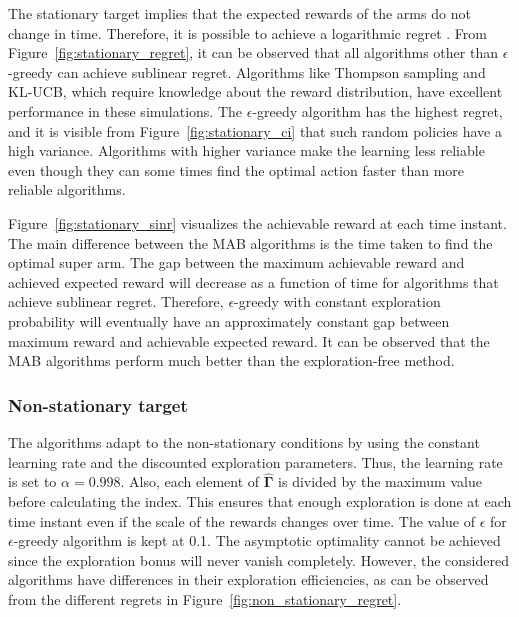 \documentclass[english, 12pt, a4paper, elec, utf8, a-1b, online]{aaltothesis}
\newcommand{\vsinrb}{\widehat{\boldsymbol{\Gamma}}}
\begin{document}
The stationary target implies that the expected rewards of the arms do not change in time.
Therefore, it is possible to achieve a logarithmic regret \cite{Lattimore2019}.
From Figure~\ref{fig:stationary_regret}, it can be observed that all algorithms other than $\epsilon$-greedy can achieve sublinear regret.
Algorithms like Thompson sampling and KL-UCB, which require knowledge about the reward distribution, have excellent performance in these simulations.
The $\epsilon$-greedy algorithm has the highest regret, and it is visible from Figure~\ref{fig:stationary_ci} that such random policies have a high variance.
Algorithms with higher variance make the learning less reliable even though they can some times find the optimal action faster than more reliable algorithms.

Figure~\ref{fig:stationary_sinr} visualizes the achievable reward at each time instant.
The main difference between the MAB algorithms is the time taken to find the optimal super arm.
The gap between the maximum achievable reward and achieved expected reward will decrease as a function of time for algorithms that achieve sublinear regret.
Therefore, $\epsilon$-greedy with constant exploration probability will eventually have an approximately constant gap between maximum reward and achievable expected reward.
It can be observed that the MAB algorithms perform much better than the exploration-free method.

\subsubsection{Non-stationary target}

The algorithms adapt to the non-stationary conditions by using the constant learning rate and the discounted exploration parameters.
Thus, the learning rate is set to $\alpha = 0.998$.
Also, each element of $\vsinrb$ is divided by the maximum value before calculating the index.
This ensures that enough exploration is done at each time instant even if the scale of the rewards changes over time.
The value of $\epsilon$ for $\epsilon$-greedy algorithm is kept at 0.1.
The asymptotic optimality cannot be achieved since the exploration bonus will never vanish completely.
However, the considered algorithms have differences in their exploration efficiencies, as can be observed from the different regrets in Figure~\ref{fig:non_stationary_regret}.
\end{document}
